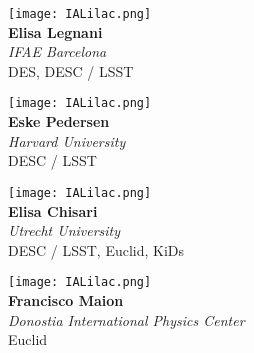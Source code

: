 \documentclass[12pt,letterpaper]{article}
\begin{document}
\begin{multicols}{2}
    \begin{minipage}[t][2in][c]{.45\textwidth}
    \centering
    \texttt{[image: IALilac.png]}\\ \vspace{.5cm}
    \Huge \textbf{Elisa Legnani}\\
    \vspace{0.5cm}
    \Large \textit{IFAE Barcelona} \\
    \vspace{0.5cm}
    \small DES, DESC / LSST
    \end{minipage}
    \vspace{1cm}
    
    \begin{minipage}[t][2in][c]{.45\textwidth}
    \centering
    \texttt{[image: IALilac.png]}\\ \vspace{.5cm}
    \Huge \textbf{Eske Pedersen}\\
    \vspace{0.5cm}
    \Large \textit{Harvard University} \\
    \vspace{0.5cm}
    \small DESC / LSST
    \end{minipage}
    \vspace{1cm}
    
    \begin{minipage}[t][2in][c]{.45\textwidth}
    \centering
    \texttt{[image: IALilac.png]}\\ \vspace{.5cm}
    \Huge \textbf{Elisa Chisari}\\
    \vspace{0.5cm}
    \Large \textit{Utrecht University} \\
    \vspace{0.5cm}
    \small DESC / LSST, Euclid, KiDs
    \end{minipage}
    \vspace{1cm}
    
    \begin{minipage}[t][2in][c]{.45\textwidth}
    \centering
    \texttt{[image: IALilac.png]}\\ \vspace{.5cm}
    \Huge \textbf{Francisco Maion}\\
    \vspace{0.5cm}
    \large \textit{Donostia International Physics Center} \\
    \vspace{0.5cm}
    \small Euclid
    \end{minipage}
    \vspace{1cm}
    

\end{multicols}
\end{document}
